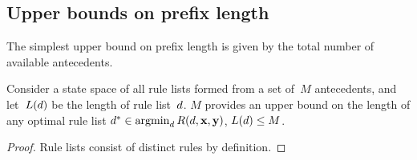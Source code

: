 
\subsection{Upper bounds on prefix length}
\label{sec:ub-prefix-length}

\begin{arxiv}
The simplest upper bound on prefix length is given by the total
number of available antecedents.

\begin{proposition}
\label{prop:trivial-length}
Consider a state space of all rule lists formed from
a set of~$M$ antecedents,
and let~$L({d})$ be the length of rule list~${d}$.
%
$M$ provides an upper bound on the length of
any optimal rule list
${d^* \in \operatorname*{argmin}_{d} R({d}, \mathbf{x}, \mathbf{y})}$,
\ie ${L({d}) \le M}$.
\end{proposition}

\begin{proof}
Rule lists consist of distinct rules by definition.
\end{proof}
\end{arxiv}

